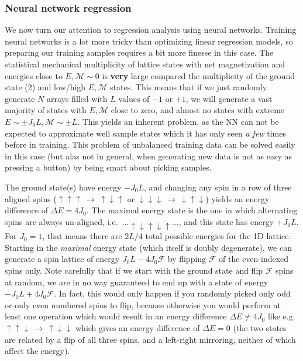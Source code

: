 \documentclass[a4paper, twocolumn]{article}
\begin{document}
\subsubsection{Neural network regression}
We now turn our attention to regression analysis using neural networks. Training neural networks is a lot more tricky than optimizing linear regression models, so preparing our training samples requires a bit more finesse in this case. The statistical mechanical multiplicity of lattice states with net magnetization and energies close to $E,\mathcal{M}\sim0$ is \textbf{very} large compared the multiplicity of the ground state ($2$) and low/high $E,\mathcal{M}$ states. This means that if we just randomly generate $N$ arrays filled with $L$ values of $-1$ or $+1$, we will generate a vast majority of states with $E,\mathcal{M}$ close to zero, and almost no states with extreme $E\sim\pm J_0L,\mathcal{M}\sim \pm L$. This yields an inherent problem, as the NN can not be expected to approximate well sample states which it has only seen \textit{a few} times before in training. This problem of unbalanced training data can be solved easily in this case (but alas not in general, when generating new data is not as easy as pressing a button) by being smart about picking samples.

The ground state(s) have energy $-J_0L$, and changing any spin in a row of three aligned spins ($\uparrow\uparrow\uparrow\ \rightarrow \ \uparrow\downarrow\uparrow$ or $\downarrow\downarrow\downarrow\ \rightarrow\ \downarrow\uparrow\downarrow$) yields an energy difference of $\Delta E=4J_0$. The maximal energy state is the one in which alternating spins are always un-aligned, i.e.\ $\dots\uparrow\downarrow\uparrow\downarrow\uparrow\dots$, and this state has energy $+J_0L$. For $J_0=1$, that means there are $2L/4$ total possible energies for the 1D lattice. Starting in the \textit{maximal} energy state (which itself is doubly degenerate), we can generate a spin lattice of energy $J_0L-4J_0\mathcal{F}$ by flipping $\mathcal{F}$ of the even-indexed spins only. Note carefully that if we start with the ground state and flip $\mathcal{F}$ spins at random, we are in no way guaranteed to end up with a state of energy $-J_0L+4J_0\mathcal{F}$. In fact, this would only happen if you randomly picked only odd or only even numbered spins to flip, because otherwise you would perform at least one operation which would result in an energy difference $\Delta E\not=4J_0$ like e.g.\ $\uparrow\uparrow\downarrow\ \rightarrow \ \uparrow\downarrow\downarrow$ which gives an energy difference of $\Delta E=0$ (the two states are related by a flip of all three spins, and a left-right mirroring, neither of which affect the energy).
\end{document}
